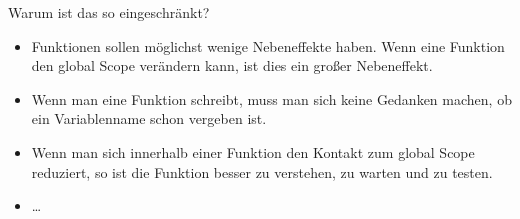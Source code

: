 \begin{frame}
	
\begin{block}{Warum ist das so eingeschränkt?}
	\pause 
	\begin{itemize}[<+->]
		\item Funktionen sollen möglichst wenige Nebeneffekte haben. Wenn eine Funktion den global Scope verändern kann, ist dies ein großer Nebeneffekt. 
		\item Wenn man eine Funktion schreibt, muss man sich keine Gedanken machen, ob ein Variablenname schon vergeben ist. 
		\item Wenn man sich innerhalb einer Funktion den Kontakt zum global Scope reduziert, so ist die Funktion besser zu verstehen, zu warten und zu testen. 
		\item \dots
	\end{itemize}
\end{block}
	
\end{frame}







